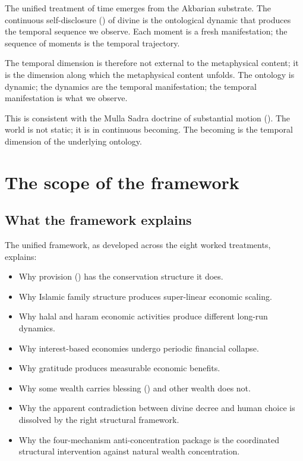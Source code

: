The unified treatment of time emerges from the Akbarian
substrate. The continuous self-disclosure () of
divine  is the ontological dynamic that produces the
temporal sequence we observe. Each moment is a fresh
manifestation; the sequence of moments is the temporal trajectory.

The temporal dimension is therefore not external to the
metaphysical content; it is the dimension along which the
metaphysical content unfolds. The ontology is dynamic; the
dynamics are the temporal manifestation; the temporal
manifestation is what we observe.

This is consistent with the Mulla Sadra doctrine of substantial
motion (). The world is not static; it is
in continuous becoming. The becoming is the temporal dimension of
the underlying ontology.

\section{The scope of the framework}
\label{sec:unified-scope}

\subsection{What the framework explains}

The unified framework, as developed across the eight worked
treatments, explains:

\begin{itemize}[leftmargin=2em]
    \item Why provision () has the conservation
    structure it does.
    \item Why Islamic family structure produces super-linear
    economic scaling.
    \item Why halal and haram economic activities produce
    different long-run dynamics.
    \item Why interest-based economies undergo periodic financial
    collapse.
    \item Why gratitude produces measurable economic benefits.
    \item Why some wealth carries blessing () and
    other wealth does not.
    \item Why the apparent contradiction between divine decree and
    human choice is dissolved by the right structural framework.
    \item Why the four-mechanism anti-concentration package is the
    coordinated structural intervention against natural wealth
    concentration.
\end{itemize}

